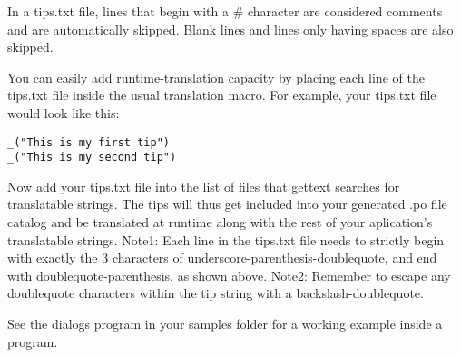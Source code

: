 In a tips.txt file, lines that begin with a \# character are considered comments 
and are automatically skipped. Blank lines and lines only having spaces are also 
skipped.

You can easily add runtime-translation capacity by placing each line of the 
tips.txt file inside the usual translation macro. For example, your tips.txt 
file would look like this:
\begin{verbatim}
_("This is my first tip")
_("This is my second tip")
\end{verbatim}
Now add your tips.txt file into the list of files that gettext searches 
for translatable strings. The tips will thus get included into your 
generated .po file catalog and be translated at runtime along with the rest of 
your aplication's translatable strings. 
Note1: Each line in the tips.txt file needs to strictly begin with exactly the 
3 characters of underscore-parenthesis-doublequote, and end with 
doublequote-parenthesis, as shown above. 
Note2: Remember to escape any doublequote characters within the tip string with
a backslash-doublequote.

See the dialogs program in your samples folder for a working example inside a 
program.
